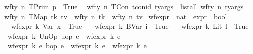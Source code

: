 \begin{isabellebody}
\ {\isacharbar}{\kern0pt}\ {\isachardoublequoteopen}wf{\isacharunderscore}{\kern0pt}ty\ n\ {\isacharparenleft}{\kern0pt}TPrim\ p{\isacharparenright}{\kern0pt}\ {\isacharequal}{\kern0pt}\ True{\isachardoublequoteclose}\isanewline
\ {\isacharbar}{\kern0pt}\ {\isachardoublequoteopen}wf{\isacharunderscore}{\kern0pt}ty\ n\ {\isacharparenleft}{\kern0pt}TCon\ tcon{\isacharunderscore}{\kern0pt}id\ ty{\isacharunderscore}{\kern0pt}args{\isacharparenright}{\kern0pt}\ {\isacharequal}{\kern0pt}\ list{\isacharunderscore}{\kern0pt}all\ {\isacharparenleft}{\kern0pt}wf{\isacharunderscore}{\kern0pt}ty\ n{\isacharparenright}{\kern0pt}\ ty{\isacharunderscore}{\kern0pt}args{\isachardoublequoteclose}\isanewline
\ {\isacharbar}{\kern0pt}\ {\isachardoublequoteopen}wf{\isacharunderscore}{\kern0pt}ty\ n\ {\isacharparenleft}{\kern0pt}TMap\ tk\ tv{\isacharparenright}{\kern0pt}\ {\isacharequal}{\kern0pt}\ {\isacharparenleft}{\kern0pt}wf{\isacharunderscore}{\kern0pt}ty\ n\ tk\ {\isasymand}\ wf{\isacharunderscore}{\kern0pt}ty\ n\ tv{\isacharparenright}{\kern0pt}{\isachardoublequoteclose}\isanewline
\isanewline
{}\isamarkupfalse%
\ wf{\isacharunderscore}{\kern0pt}expr\ {\isacharcolon}{\kern0pt}{\isacharcolon}{\kern0pt}\ {\isachardoublequoteopen}nat\ {\isasymRightarrow}\ expr\ {\isasymRightarrow}\ bool{\isachardoublequoteclose}\isanewline
\ \ \ \isanewline
\ \ \ \ {\isachardoublequoteopen}wf{\isacharunderscore}{\kern0pt}expr\ k\ {\isacharparenleft}{\kern0pt}Var\ x{\isacharparenright}{\kern0pt}\ {\isacharequal}{\kern0pt}\ True{\isachardoublequoteclose}\isanewline
\ \ {\isacharbar}{\kern0pt}\ {\isachardoublequoteopen}wf{\isacharunderscore}{\kern0pt}expr\ k\ {\isacharparenleft}{\kern0pt}BVar\ i{\isacharparenright}{\kern0pt}\ {\isacharequal}{\kern0pt}\ True{\isachardoublequoteclose}\isanewline
\ \ {\isacharbar}{\kern0pt}\ {\isachardoublequoteopen}wf{\isacharunderscore}{\kern0pt}expr\ k\ {\isacharparenleft}{\kern0pt}Lit\ l{\isacharparenright}{\kern0pt}\ {\isacharequal}{\kern0pt}\ True{\isachardoublequoteclose}\isanewline
\ \ {\isacharbar}{\kern0pt}\ {\isachardoublequoteopen}wf{\isacharunderscore}{\kern0pt}expr\ k\ {\isacharparenleft}{\kern0pt}UnOp\ uop\ e{\isacharparenright}{\kern0pt}\ {\isacharequal}{\kern0pt}\ wf{\isacharunderscore}{\kern0pt}expr\ k\ e{\isachardoublequoteclose}\isanewline
\ \ {\isacharbar}{\kern0pt}\ {\isachardoublequoteopen}wf{\isacharunderscore}{\kern0pt}expr\ k\ {\isacharparenleft}{\kern0pt}e{}\ {\isasymguillemotleft}bop{\isasymguillemotright}\ e{}{\isacharparenright}{\kern0pt}\ {\isacharequal}{\kern0pt}\ {\isacharparenleft}{\kern0pt}wf{\isacharunderscore}{\kern0pt}expr\ k\ e{}\ {\isasymand}\ wf{\isacharunderscore}{\kern0pt}expr\ k\ e{}{\isacharparenright}{\kern0pt}{\isachardoublequoteclose}\isanewline

\end{isabellebody}
